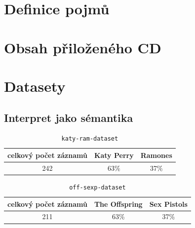\documentclass[thesis=M,czech]{FITthesis}[2012/06/26]
\begin{document}
\chapter{Definice pojmů}


\chapter{Obsah přiloženého CD}


\begin{figure}
\end{figure}

\chapter{Datasety}\label{app:datasets}

\section{Interpret jako sémantika}

\begin{table}[!htbp]

    \captionsetup{
      justification=raggedright,
      singlelinecheck=false
    }
    \caption{\texttt{katy-ram-dataset}}
    \label{sec:katy-ram-dataset}
    \begin{tabular}{|c|c|l|}
    \hline
    celkový počet záznamů      & Katy Perry                  & Ramones                   \\ \hline
    {\color[HTML]{000000} 242} & {\color[HTML]{000000} 63\%} & \multicolumn{1}{c|}{37\%} \\ \hline
    \end{tabular}
\end{table}

\begin{table}[!htbp]

	    \captionsetup{
      justification=raggedright,
      singlelinecheck=false
    }

    \caption{\texttt{off-sexp-dataset}}
    \label{sec:off-sexp-dataset}
    \begin{tabular}{|c|c|l|}
    \hline
    celkový počet záznamů      & The Offspring                  & Sex Pistols                   \\ \hline
    {\color[HTML]{000000} 211} & {\color[HTML]{000000} 63\%} & \multicolumn{1}{c|}{37\%} \\ \hline
    \end{tabular}
\end{table}
\end{document}
